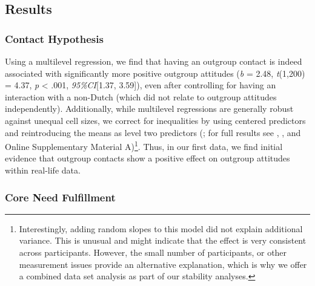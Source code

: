 \subsection{Results}

\subsubsection{Contact Hypothesis}

Using a multilevel regression, we find that having an outgroup contact
is indeed associated with significantly more positive outgroup attitudes
(\textit{b} = 2.48, \textit{t}(1,200) = 4.37, \textit{p} \textless{}
.001, \textit{95\%CI}{[}1.37, 3.59{]}), even after controlling for
having an interaction with a non-Dutch (which did not relate to outgroup
attitudes independently). Additionally, while multilevel regressions
are generally robust against unequal cell sizes, we correct for
inequalities by using centered predictors and reintroducing the means as
level two predictors (\citealp{yaremych2021a}; for full results see
, ,
and Online Supplementary Material
A)\footnote{Interestingly, adding random slopes to this model did not explain additional variance. This is unusual and might indicate that the effect is very consistent across participants. However, the small number of participants, or other measurement issues provide an alternative explanation, which is why we offer a combined data set analysis as part of our stability analyses.}.
Thus, in our first data, we find initial evidence that outgroup contacts
show a positive effect on outgroup attitudes within real-life data.

\subsubsection{Core Need Fulfillment}

